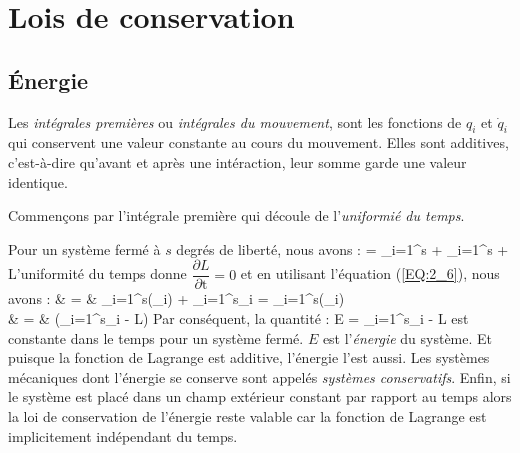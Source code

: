 \chapter{Lois de conservation}

\section{\'Energie}\label{PAR:6}

Les \emph{int\'egrales premi\`eres} ou \emph{int\'egrales du mouvement}, sont les fonctions de $q_{i}$ et $\dot{q}_{i}$ qui conservent une valeur constante au cours du mouvement. Elles sont additives, c'est-\`a-dire qu'avant et après une int\'eraction, leur somme garde une valeur identique.

Commen\c{c}ons par l'int\'egrale premi\`ere qui d\'ecoule de l'\emph{uniformi\'e du temps}.

Pour un syst\`eme ferm\'e \`a $s$ degr\'es de libert\'e, nous avons :
\benn
	 = \sum_{i=1}^{s} + \sum_{i=1}^{s} + 
\eenn
L'uniformit\'e du temps donne $\dfrac{\partial L}{\partial \mathrm{t}} = 0$ et en utilisant l'\'equation (\ref{EQ:2_6}), nous avons :
\bea
	 & = & \sum_{i=1}^{s}\left(_{i}\right) + \sum_{i=1}^{s}_{i} = \sum_{i=1}^{s}\left(_{i}\right) \nonumber \\
	 & = & \left(\sum_{i=1}^{s}_{i} - L\right) \nonumber
\eea
Par cons\'equent, la quantit\'e :
\be
	E = \sum_{i=1}^{s}_{i} - L \label{EQ:6_1}
\ee
est constante dans le temps pour un syst\`eme ferm\'e. $E$ est l'\emph{\'energie} du syst\`eme. Et puisque la fonction de Lagrange est additive, l'\'energie l'est aussi. Les syst\`emes m\'ecaniques dont l'\'energie se conserve sont appel\'es \emph{syst\`emes conservatifs}. Enfin, si le syst\`eme est plac\'e dans un champ ext\'erieur constant par rapport au temps alors la loi de conservation de l'\'energie reste valable car la fonction de Lagrange est implicitement ind\'ependant du temps.

